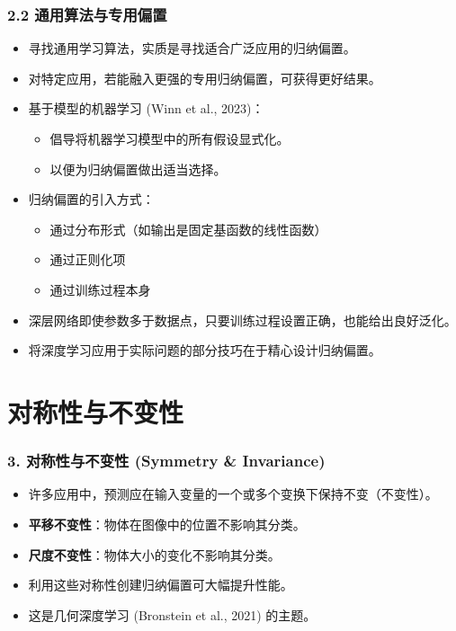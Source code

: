 \documentclass[t,aspectratio=169]{beamer} %
\begin{document}
\begin{frame}
    \frametitle{2.2 通用算法与专用偏置}
    \begin{itemize}
        \item 寻找通用学习算法，实质是寻找\alert{适合广泛应用的归纳偏置}。
        \item 对特定应用，若能融入\alert{更强的专用归纳偏置}，可获得更好结果。
        \item \alert{基于模型的机器学习} (Winn et al., 2023)：
        \begin{itemize}
            \item 倡导将机器学习模型中的所有假设\alert{显式化}。
            \item 以便为归纳偏置做出适当选择。
        \end{itemize}
        \item 归纳偏置的引入方式：
        \begin{itemize}
            \item 通过\alert{分布形式}（如输出是固定基函数的线性函数）
            \item 通过\alert{正则化项}
            \item 通过\alert{训练过程本身}
        \end{itemize}
        \item 深层网络即使参数多于数据点，只要训练过程设置正确，也能给出良好泛化。
        \item 将深度学习应用于实际问题的部分技巧在于\alert{精心设计归纳偏置}。
    \end{itemize}
\end{frame}

\section{对称性与不变性}

\begin{frame}
    \frametitle{3. 对称性与不变性 (Symmetry \& Invariance)}
    \begin{itemize}
        \item 许多应用中，预测应在输入变量的\alert{一个或多个变换}下保持不变（\alert{不变性}）。
        \item \textbf{平移不变性}：物体在图像中的位置不影响其分类。
        \item \textbf{尺度不变性}：物体大小的变化不影响其分类。
        \item 利用这些对称性创建归纳偏置可\alert{大幅提升性能}。
        \item 这是\alert{几何深度学习} (Bronstein et al., 2021) 的主题。
    \end{itemize}
\end{frame}
\end{document}
